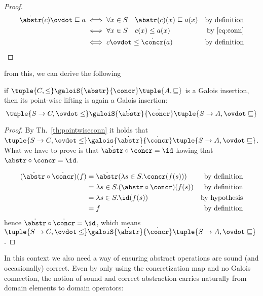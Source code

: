 \begin{proof}
  \begin{align*}
    \dot\abstr(c) \ovdot\sqsubseteq a & \iff \forall x\in S \quad \abstr(c)(x) \sqsubseteq a(x) & \text{by definition} \\
                                      & \iff \forall x\in S \quad c(x) \leq a(x) & \text{by~\eqref{eq:conn}} \\
                                      & \iff c \ovdot\leq \dot\concr(a) & \text{by definition}
  \end{align*}
\end{proof}

from this, we can derive the following
\begin{theorem}\label{th:liftingins}
  if
  \(\tuple{C, \leq} \galoiS{\abstr}{\concr} \tuple{A, \sqsubseteq}\)
  is a Galois insertion, then its point-wise lifting is again a Galois
  insertion:
  \begin{equation*}
    \tuple{S \to C, \ovdot\leq} \galoiS{\dot\abstr}{\dot\concr} \tuple{S\to A, \ovdot\sqsubseteq}
  \end{equation*}
\end{theorem}

\begin{proof}
  By Th.~\ref{th:pointwiseconn} it holds that
  \(\tuple{S \to C, \ovdot\leq} \galois{\dot\abstr}{\dot\concr}
  \tuple{S\to A, \ovdot\sqsubseteq}\). What we have to prove is that
  \(\dot\abstr \circ \dot\concr = \id\) kowing that
  \(\abstr \circ \concr = \id\).

  \begin{align*}
    (\dot\abstr \circ \dot\concr)(f) & = \dot\abstr(\lambda s\in S . \concr(f(s))) & \text{by definition} \\
                                     & = \lambda s\in S . (\abstr \circ \concr)(f(s)) & \text{by definition} \\
                                     & = \lambda s\in S . \id(f(s)) & \text{by hypothesis} \\
                                     & = f & \text{by definition}
  \end{align*}
  hence \(\dot\abstr \circ \dot\concr = \id\), which means
  \(\tuple{S \to C, \ovdot\leq} \galoiS{\dot\abstr}{\dot\concr}
  \tuple{S\to A, \ovdot\sqsubseteq}\).
\end{proof}

In this context we also need a way of ensuring abstract operations are
sound (and occasionally) correct. Even by only using the
concretization map and no Galois connection, the notion of sound and
correct abstraction carries naturally from domain elements to domain
operators:

